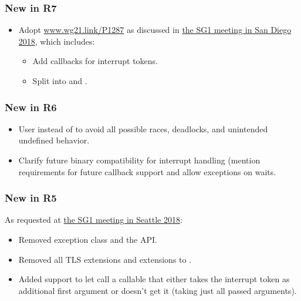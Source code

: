 \subsubsection*{New in R7}
\begin{itemize}
 \item Adopt \url{www.wg21.link/P1287} as discussed in
        \href{http://wiki.edg.com/bin/view/Wg21sandiego2018/P1287R0}{the SG1 meeting in San Diego 2018},
        which includes:
        \begin{itemize}
         \item Add callbacks for interrupt tokens.
         \item Split into  and .
        \end{itemize}
\end{itemize}

\subsubsection*{New in R6}
\begin{itemize}
 \item User  instead of 
        to avoid all possible races, deadlocks, and unintended undefined behavior.
 \item Clarify future binary compatibility for interrupt handling
        (mention requirements for future callback support and allow  exceptions on waits.
\end{itemize}

\subsubsection*{New in R5}
As requested at
\href{http://wiki.edg.com/bin/view/ExecSeattle2018/MinutesDay2}{the SG1 meeting in Seattle 2018}:
\begin{itemize}
 \item Removed exception class  and the  API.
 \item Removed all TLS extensions and extensions to .
 \item Added support to let  call a callable that
        either takes the interrupt token as additional first argument
        or doesn't get it (taking just all passed arguments).
\end{itemize}

